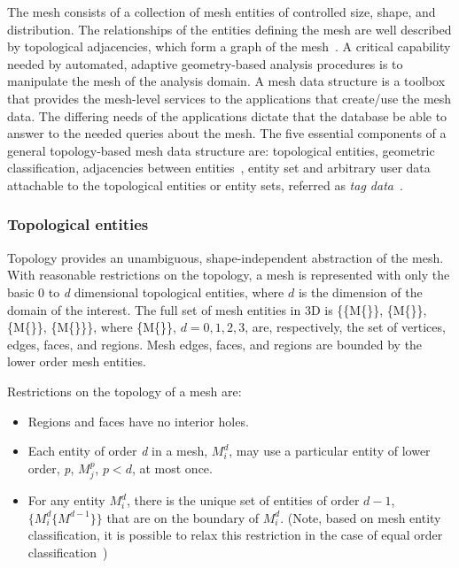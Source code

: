 The mesh consists of a collection of mesh entities of controlled size, shape,
and distribution. The relationships of the entities defining the mesh are well
described by topological adjacencies, which form a graph of the mesh~\cite{beall97, celes05, garimella02, aomd03}. A critical
capability needed by automated, adaptive geometry-based analysis 
procedures is to manipulate the mesh of the analysis domain. A mesh 
data structure is a toolbox that provides the mesh-level services to the
applications that create/use the mesh data. The differing needs of the
applications dictate that the database be able to answer to the needed
queries about the mesh. 
The five essential components of a general topology-based mesh data structure are:
topological entities, geometric classification, adjacencies between
entities~\cite{beall97}, entity set and arbitrary user data attachable to the topological entities or entity sets, referred as \emph{tag data}~\cite{itapsweb, Ollivier-etal06}.

\subsubsection{Topological entities}

Topology provides an unambiguous, shape-independent abstraction of the mesh.
With reasonable restrictions on the topology, a mesh is represented with only
the basic $0$ to \emph{d}
dimensional topological entities, where $d$ is the dimension of the domain of
the interest. The full set of mesh entities in 3D is \{\{M\{\Mz\}\}, \{M\{\Mo\}\}, \{M\{\Mt\}\},
\{M\{\Mth\}\}\}, where \{M\{\Md\}\}, $d=0,1,2,3$, are, respectively, the set of vertices,
edges, faces, and regions. Mesh edges, faces, and regions are bounded by the lower
order mesh entities. 

Restrictions on the topology of a mesh are:

\begin{itemize}
\item Regions and faces have no interior holes.
\item Each entity of order \emph{d} in a mesh, $M^d_i$, may use a particular
entity of lower order, \emph{p}, $M^p_j$, $p < d$, at most once.
\item For any entity $M^d_i$, there is the unique set of entities of order
$d-1$, $\{M^d_i\{M^{d-1}\}\}$ that are on the boundary of $M^d_i$. (Note, based
on mesh entity classification, it is possible to relax this restriction in the
case of equal order classification~\cite{beall97})
\end{itemize}

